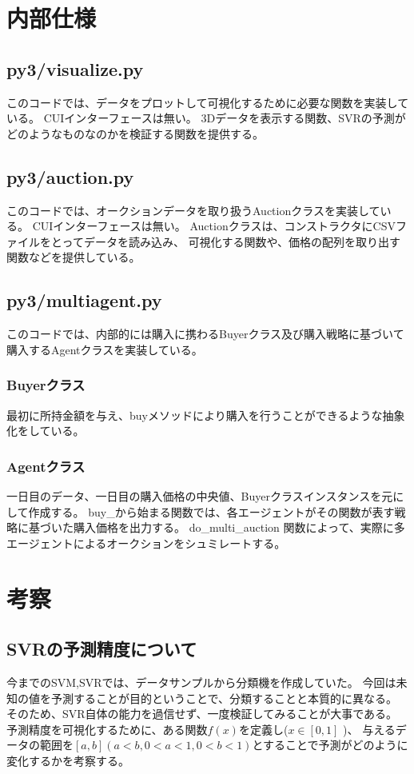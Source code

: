 \documentclass[]{jsarticle}
\begin{document}
\section{内部仕様}
\subsection{py3/visualize.py}
このコードでは、データをプロットして可視化するために必要な関数を実装している。
CUIインターフェースは無い。
3Dデータを表示する関数、SVRの予測がどのようなものなのかを検証する関数を提供する。

\subsection{py3/auction.py}
このコードでは、オークションデータを取り扱うAuctionクラスを実装している。
CUIインターフェースは無い。
Auctionクラスは、コンストラクタにCSVファイルをとってデータを読み込み、
可視化する関数や、価格の配列を取り出す関数などを提供している。


\subsection{py3/multiagent.py}
このコードでは、内部的には購入に携わるBuyerクラス及び購入戦略に基づいて購入するAgentクラスを実装している。
\subsubsection{Buyerクラス}
最初に所持金額を与え、buyメソッドにより購入を行うことができるような抽象化をしている。
\subsubsection{Agentクラス}
一日目のデータ、一日目の購入価格の中央値、Buyerクラスインスタンスを元にして作成する。
buy\_から始まる関数では、各エージェントがその関数が表す戦略に基づいた購入価格を出力する。
do\_multi\_auction 関数によって、実際に多エージェントによるオークションをシュミレートする。

\section{考察}
\subsection{SVRの予測精度について}
今までのSVM,SVRでは、データサンプルから分類機を作成していた。
今回は未知の値を予測することが目的ということで、分類することと本質的に異なる。
そのため、SVR自体の能力を過信せず、一度検証してみることが大事である。
予測精度を可視化するために、ある関数$f(x)$を定義し($x \in [0,1]$ )、
与えるデータの範囲を$[a,b](a<b,0<a<1,0<b<1)$とすることで予測がどのように
変化するかを考察する。
\newpage
\end{document}
